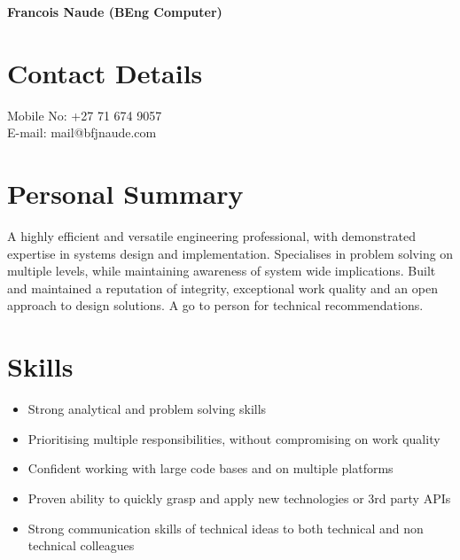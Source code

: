 \documentclass[11pt,a4paper]{article}
\begin{document}
\noindent
{\bfseries\LARGE Francois Naude (BEng Computer)}\\ 

\section*{Contact Details}
{\large
Mobile No: +27 71 674 9057\\
E-mail: mail@bfjnaude.com
}
\section*{Personal Summary}
A highly efficient and versatile engineering professional, with demonstrated expertise in
systems design and implementation. Specialises in problem solving on multiple levels, while
maintaining awareness of system wide implications. Built and maintained a reputation of
integrity, exceptional work quality and an open approach to design solutions. A go to person for
technical recommendations.

\section*{Skills}
\begin{itemize}
	\item Strong analytical and problem solving skills
	\item Prioritising multiple responsibilities, without compromising on work quality
	\item Confident working with large code bases and on multiple platforms
	\item Proven ability to quickly grasp and apply new technologies or 3rd party APIs
	\item Strong communication skills of technical ideas to both technical and non technical colleagues 
\end{itemize}
\end{document}

